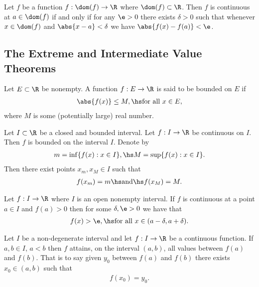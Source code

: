 \documentclass{article}
\begin{document}
\begin{theorem}
	Let $f$ be a function $f:\dom(f)\to\R$ where $\dom(f) \subset\R$.
	Then $f$ is continuous at $a\in\dom(f)$ if and only if for any
	$\e>0$ there exists $\delta>0$ such that whenever $x\in\dom(f)$
	and $\abs{x-a}<\delta$ we have $\abs{f(x)-f(a)}<\e$.
\end{theorem}

\subsection{The Extreme and Intermediate Value Theorems}

\begin{definition}
	Let $E\subset\R$ be nonempty. A function $f:E\to\R$ is said to be
	bounded on $E$ if
	\begin{align*}
		\abs{f(x)}\leq M,\hs\text{for all } x\in E,
	\end{align*}
	where $M$ is some (potentially large) real number.
\end{definition}

\begin{theorem}
	Let $I\subset\R$ be a closed and bounded interval. Let
	$f:I\to\R$ be continuous on $I$. Then $f$ is bounded on the interval
	$I$. Denote by
	\begin{align*}
		m=\inf\{f(x):x\in I\},\hs M=\sup\{f(x):x\in I\}.
	\end{align*}
	Then there exist points $x_m,x_M\in I$ such that
	\begin{align*}
		f(x_m)=m\hs\text{and}\hs f(x_M)=M.
	\end{align*}
\end{theorem}

\setcounter{theorem}{3}
\begin{lemma}
	Let $f:I\to\R$ where $I$ is an open nonempty interval. If $f$ is
	continuous at a point $a\in I$ and $f(a)>0$ then for some
	$\delta,\e>0$ we have that
	\begin{align*}
		f(x)>\e,\hs \text{for all }x\in(a-\delta, a+\delta).
	\end{align*}
\end{lemma}

\begin{theorem}
	Let $I$ be a non-degenerate interval and let $f:I\to\R$ be a
	continuous function. If $a,b\in I$, $a<b$ then $f$ attains,
	on the interval $(a,b)$, all values between $f(a)$ and $f(b)$.
	That is to say given $y_0$ between $f(a)$ and $f(b)$ there
	exists $x_0\in(a,b)$ such that
	\begin{align*}
		f(x_0)=y_0.
	\end{align*}
\end{theorem}
\end{document}
